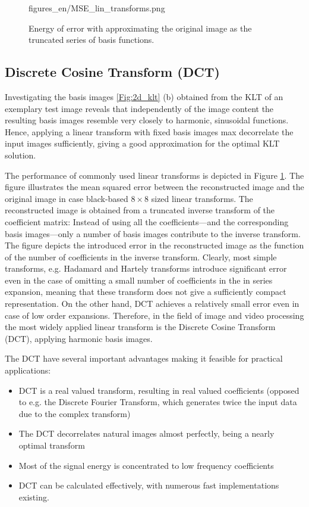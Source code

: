 \begin{figure}[h!]
	\centering
	\begin{overpic}[width = 0.8\columnwidth ]{figures_en/MSE_lin_transforms.png}
	\end{overpic}
	\caption{Energy of error with approximating the original image as the truncated series of basis functions.}
	\label{Fig:MSE}
\end{figure}

\subsection{Discrete Cosine Transform (DCT)}

Investigating the basis images \ref{Fig:2d_klt} (b) obtained from the KLT of an exemplary test image reveals that independently of the image content the resulting basis images resemble very closely to harmonic, sinusoidal functions.
Hence, applying a linear transform with fixed basis images max decorrelate the input images sufficiently, giving a good approximation for the optimal KLT solution.

The performance of commonly used linear transforms is depicted in Figure \ref{Fig:MSE}.
The figure illustrates the mean squared error between the reconstructed image and the original image in case black-based $8 \times 8$ sized linear transforms.
The reconstructed image is obtained from a truncated inverse transform of the coefficient matrix:
Instead of using all the coefficients---and the corresponding basis images---only a number of basis images contribute to the inverse transform.
The figure depicts the introduced error in the reconstructed image as the function of the number of coefficients in the inverse transform.
Clearly, most simple transforms, e.g. Hadamard and Hartely transforms introduce significant error even in the case of omitting a small number of coefficients in the in series expansion, meaning that these transform does not give a sufficiently compact representation.
On the other hand, DCT achieves a relatively small error even in case of low order expansions.
Therefore, in the field of image and video processing the most widely applied linear transform is the Discrete Cosine Transform (DCT), applying harmonic basis images.

The DCT have several important advantages making it feasible for practical applications:
\begin{itemize}
\item DCT is a real valued transform, resulting in real valued coefficients (opposed to e.g. the Discrete Fourier Transform, which generates twice the input data due to the complex transform)
\item The DCT decorrelates natural images almost perfectly, being a nearly optimal transform
\item Most of the signal energy is concentrated to low frequency coefficients
\item DCT can be calculated effectively, with numerous fast implementations existing.
\end{itemize}



